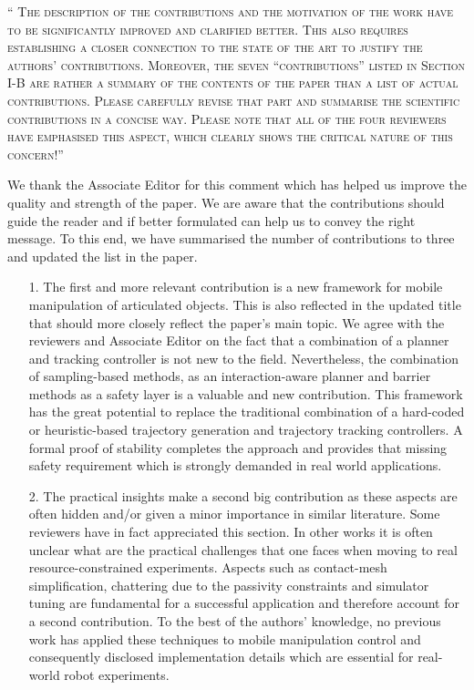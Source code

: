 \documentclass[10pt]{article}
\newcommand{\referee}[1]{\;
  \begin{minipage}[t]{.95\textwidth}
    ``{\small\color{red} \textsc{#1}}''
  \end{minipage}\medskip
  }
\begin{document}
\begin{enumerate}[label={[E:\,\arabic{enumi}]}]
\item\label{reply:E1:2}  \label{reply:ext:contributions}
\referee{The description of the contributions and the motivation of the work have to be significantly improved and clarified better. This also requires establishing a closer connection to the state of the art to justify the authors’ contributions. Moreover, the seven “contributions” listed in Section I-B are rather a summary of the contents of the paper than a list of actual contributions. Please carefully revise that part and summarise the scientific contributions in a concise way. Please note that all of the four reviewers have emphasised this aspect, which clearly shows the critical nature of this concern!}

We thank the Associate Editor for this comment which has helped us improve the quality and strength of the paper. We are aware that the contributions should guide the reader and if better formulated can help us to convey the right message. To this end, we have summarised the number of contributions to three and updated the list in the paper. 

\begin{enumerate}
\item[1.] The first and more relevant contribution is a new framework for mobile manipulation of articulated objects. This is also reflected in the updated title that should more closely reflect the paper's main topic. We agree with the reviewers and Associate Editor on the fact that a combination of a planner and tracking controller is not new to the field. Nevertheless, the combination of sampling-based methods, as an interaction-aware planner and barrier methods as a safety layer is a valuable and new contribution. This framework has the great potential to replace the traditional combination of a hard-coded or heuristic-based trajectory generation and trajectory tracking controllers. A formal proof of stability completes the approach and provides that missing safety requirement which is strongly demanded in real world applications. 

\item[2.] The practical insights make a second big contribution as these aspects are often hidden and/or given a minor importance in similar literature. Some reviewers have in fact appreciated this section. In other works it is often unclear what are the practical challenges that one faces when moving to real resource-constrained experiments. Aspects such as contact-mesh simplification, chattering due to the passivity constraints and simulator tuning are fundamental for a successful application and therefore account for a second contribution. To the best of the authors' knowledge, no previous work has applied these techniques to mobile manipulation control and consequently disclosed implementation details which are essential for real-world robot experiments.


\end{enumerate}
\end{enumerate}
\end{document}
